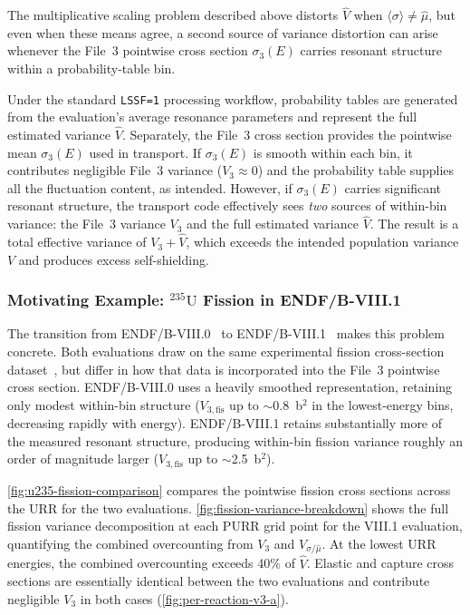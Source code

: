 \documentclass{style/nseJournal}
\newcommand{\isotope}[2]{\ensuremath{^{#1}\mathrm{#2}}}
\newcommand{\sbin}{\langle \sigma \rangle}
\begin{document}
The multiplicative scaling problem described above distorts $\hat{V}$ when $\sbin \neq \hat{\mu}$, but even when these means agree, a second source of variance distortion can arise whenever the File~3 pointwise cross section $\sigma_3(E)$ carries resonant structure within a probability-table bin.

Under the standard \texttt{LSSF=1} processing workflow, probability tables are generated from the evaluation's average resonance parameters and represent the full estimated variance $\hat{V}$. Separately, the File~3 cross section provides the pointwise mean $\sigma_3(E)$ used in transport. If $\sigma_3(E)$ is smooth within each bin, it contributes negligible File~3 variance ($V_3 \approx 0$) and the probability table supplies all the fluctuation content, as intended. However, if $\sigma_3(E)$ carries significant resonant structure, the transport code effectively sees \emph{two} sources of within-bin variance: the File~3 variance $V_3$ and the full estimated variance $\hat{V}$. The result is a total effective variance of $V_3 + \hat{V}$, which exceeds the intended population variance $V$ and produces excess self-shielding.

\subsubsection{Motivating Example: \isotope{235}{U} Fission in ENDF/B-VIII.1}
\label{sssec:u235-evaluation-change}

The transition from ENDF/B-VIII.0~\cite{endf-8.0} to ENDF/B-VIII.1~\cite{endf-8.1} makes this problem concrete. Both evaluations draw on the same experimental fission cross-section dataset~\cite{WestonTodd1992}, but differ in how that data is incorporated into the File~3 pointwise cross section. ENDF/B-VIII.0 uses a heavily smoothed representation, retaining only modest within-bin structure ($V_{3,\text{fis}}$ up to $\sim$0.8~b$^2$ in the lowest-energy bins, decreasing rapidly with energy). ENDF/B-VIII.1 retains substantially more of the measured resonant structure, producing within-bin fission variance roughly an order of magnitude larger ($V_{3,\text{fis}}$ up to $\sim$2.5~b$^2$).

\autoref{fig:u235-fission-comparison} compares the pointwise fission cross sections across the URR for the two evaluations. \autoref{fig:fission-variance-breakdown} shows the full fission variance decomposition at each PURR grid point for the VIII.1 evaluation, quantifying the combined overcounting from $V_3$ and $V_{\sigma/\hat{\mu}}$. At the lowest URR energies, the combined overcounting exceeds 40\% of $\hat{V}$. Elastic and capture cross sections are essentially identical between the two evaluations and contribute negligible $V_3$ in both cases (\autoref{fig:per-reaction-v3-a}).
\end{document}
